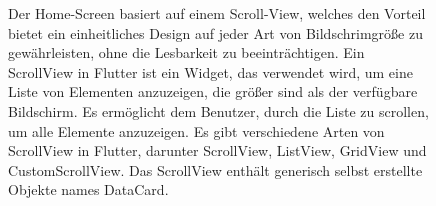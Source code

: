 \begin{figure}[h!]
\begin{minipage}[c]{0.5\textwidth}
    \end{minipage}
    \begin{minipage}[c]{0.5\textwidth}
      \label{fig:Startpagebild}
      Der Home-Screen basiert auf einem Scroll-View,
      welches den Vorteil bietet ein einheitliches Design auf jeder Art von Bildschrimgröße zu gewährleisten, ohne die Lesbarkeit zu beeinträchtigen. 
      Ein ScrollView in Flutter ist ein Widget, das verwendet wird, um eine Liste von Elementen anzuzeigen, die größer sind als der verfügbare Bildschirm. 
      Es ermöglicht dem Benutzer, durch die Liste zu scrollen, um alle Elemente anzuzeigen. Es gibt verschiedene Arten von ScrollView in Flutter, darunter ScrollView, ListView, GridView und CustomScrollView. Das ScrollView enthält generisch selbst erstellte Objekte names DataCard.
    \end{minipage}
  \end{figure}
  \newpage
